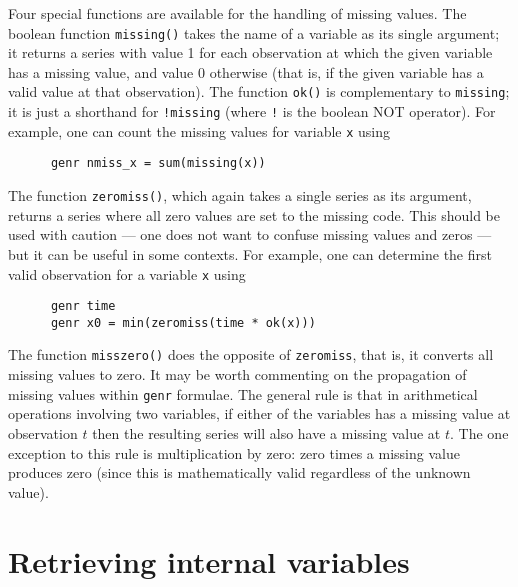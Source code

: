 Four special functions are available for the handling of missing values.
      The boolean function \verb+missing()+ takes the name of a variable
      as its single argument; it returns a series with value 1 for each observation
      at which the given variable has a missing value, and value 0 otherwise (that
      is, if the given variable has a valid value at that observation).  The
      function \verb+ok()+ is complementary to
      \verb+missing+; it is just a shorthand for
      \verb+!missing+ (where \verb+!+ is the boolean NOT
      operator).
    For example, one can count the missing values for variable
      \verb+x+ using
\begin{verbatim}
      genr nmiss_x = sum(missing(x))\end{verbatim}
The function \verb+zeromiss()+, which again takes a single
      series as its argument, returns a series where all zero values are set to the
      missing code.  This should be used with caution --- one does not want to
      confuse missing values and zeros --- but it can be useful in some
      contexts.  For example, one can determine the first valid observation for a
      variable \verb+x+ using
\begin{verbatim}
      genr time
      genr x0 = min(zeromiss(time * ok(x)))\end{verbatim}

      The function \verb+misszero()+ does the opposite of
      \verb+zeromiss+, that is, it converts all missing values to zero.
    It may be worth commenting on the propagation of missing values within
      \verb+genr+ formulae.  The general rule is that in arithmetical
      operations involving two variables, if either of the variables has a missing
      value at observation $t$ then the resulting series will
      also have a missing value at $t$.  The one exception to
      this rule is multiplication by zero: zero times a missing value produces zero
      (since this is mathematically valid regardless of the unknown value).
    

\section{Retrieving internal variables}
\label{genr-internal}

